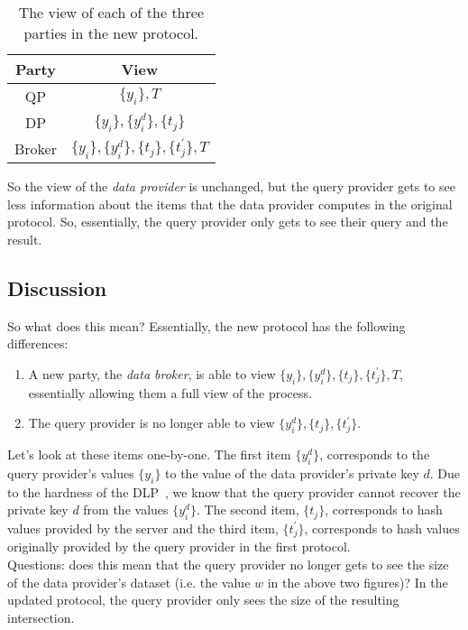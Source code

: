\documentclass[oribibl]{llncs}
\begin{document}
\begin{table}[htb!]
	\centering
	\begin{tabular}{c|c} 
		Party	& View  \\ \hline
		QP	& \( \{y_i\}, T \)   \\
		DP	& \( \{y_i\},  \{y_{i}^d\}, \{ t_j\} \)   \\ 
		Broker	&  \( \{y_i\}, \{ y_{i}^d \}, \{ t_j\}, \{t_{j}^{\prime}\}, T \)  
	\end{tabular}
	\vspace{0.25cm}
	\caption{The view of each of the three parties in the new protocol.}
\end{table}
 
 So the view of the \emph{data provider} is unchanged, but the query provider gets to see less information about the items that the data provider computes in the original protocol. So, essentially, the query provider only gets to see their query and the result.
 
 \subsection*{Discussion}
 
 So what does this mean? Essentially, the new protocol has the following differences:
 
 \begin{enumerate}
 	\item A new party, the \emph{data broker}, is able to view \( \{y_i\}, \{ y_{i}^d \}, \{ t_j\}, \{t_{j}^{\prime}\}, T \), essentially allowing them a full view of the process.
 	\item The query provider is no longer able to view \(  \{y_{i}^d\}, \{ t_j\}, \{ t_{j}^{\prime} \} \).
 \end{enumerate}

Let's look at these items one-by-one. The first item \(\{y_{i}^d\}\), corresponds to the query provider's values \( \{y_i\} \) to the value of the data provider's private key \(d\). Due to the hardness of the DLP~\cite{DLP}, we know that the query provider cannot recover the private key \(d\) from the values \( \{y_{i}^d\} \). The second item, \(\{t_j\}\), corresponds to hash values provided by the server and the third item, \( \{t_{j}^{\prime}\} \), corresponds to hash values originally provided by the query provider in the first protocol. \\

Questions: does this mean that the query provider no longer gets to see the size of the data provider's dataset (i.e. the value \(w\) in the above two figures)? In the updated protocol, the query provider only sees the size of the resulting intersection.
 



%
\end{document}
